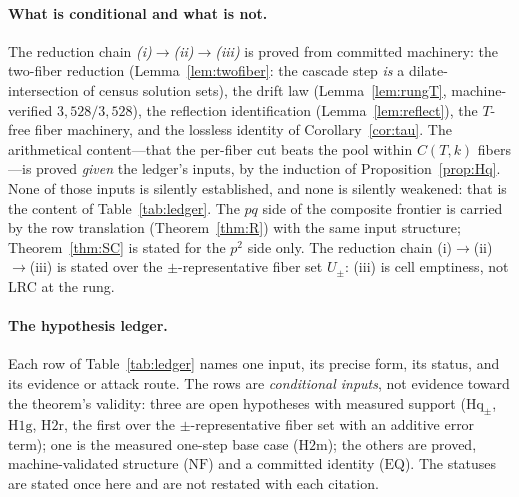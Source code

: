 \paragraph{What is conditional and what is not.}
The reduction chain \emph{(i)}$\to$\emph{(ii)}$\to$\emph{(iii)} is
proved from committed machinery: the two-fiber reduction
(Lemma~\ref{lem:twofiber}: the cascade step \emph{is} a
dilate-intersection of census solution sets), the drift law
(Lemma~\ref{lem:rungT}, machine-verified $3{,}528/3{,}528$), the
reflection identification (Lemma~\ref{lem:reflect}), the
$T$-free fiber machinery, and the lossless identity of
Corollary~\ref{cor:tau}. The arithmetical content---that the per-fiber
cut beats the pool within $C(T,k)$ fibers---is proved \emph{given} the
ledger's inputs, by the induction of Proposition~\ref{prop:Hq}. None of those inputs is silently established, and none
is silently weakened: that is the content of Table~\ref{tab:ledger}. The
$pq$ side of the composite frontier is carried by the row translation
(Theorem~\ref{thm:R}) with the same input structure; Theorem~\ref{thm:SC}
is stated for the $p^2$ side only. The reduction chain (i)$\to$(ii)$\to$(iii) is stated
over the $\pm$-representative fiber set $U_\pm$: (iii) is cell emptiness,
not LRC at the rung.

\paragraph{The hypothesis ledger.}
Each row of Table~\ref{tab:ledger} names one input, its precise form,
its status, and its evidence or attack route. The rows are
\emph{conditional inputs}, not evidence toward the theorem's validity:
three are open hypotheses with measured support ($\mathrm{Hq}_\pm$,
$\mathrm{H1g}$, $\mathrm{H2r}$, the first over the
$\pm$-representative fiber set with an additive error term); one is the measured one-step base case
($\mathrm{H2m}$); the others are proved, machine-validated structure
($\mathrm{NF}$) and a committed identity ($\mathrm{EQ}$). The statuses
are stated once here and are not restated with each citation.

